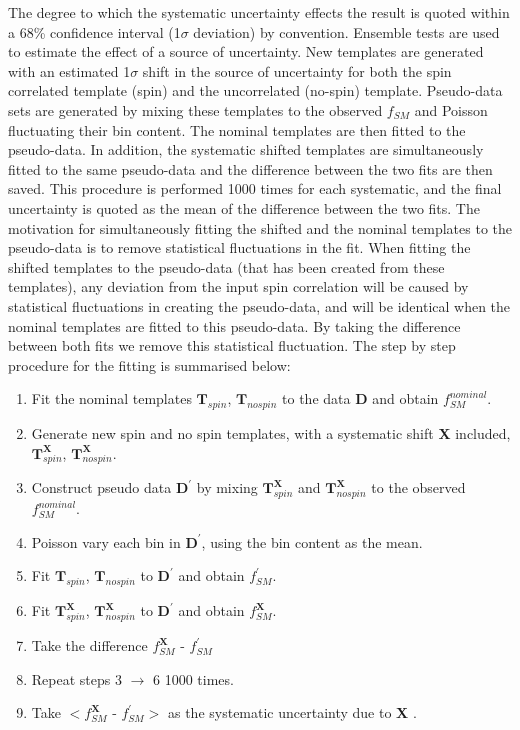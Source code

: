 The degree to which the systematic uncertainty effects the result is quoted within a 68\% confidence interval (1$\sigma$ deviation) by convention. Ensemble tests are used to estimate the effect of a source of uncertainty. New templates are generated with an estimated 1$\sigma$ shift in the source of uncertainty for both the spin correlated template (spin) and the uncorrelated (no-spin) template.  
Pseudo-data sets are generated by mixing these templates to the observed $f_{SM}$ and Poisson fluctuating their bin content.
The nominal templates are then fitted to the pseudo-data. In addition, the systematic shifted templates are simultaneously fitted to the same pseudo-data and the difference between the two fits are then saved. This procedure is performed 1000 times for each systematic, and the final uncertainty is quoted as the mean of the difference between the two fits.
	The motivation for simultaneously fitting the shifted and the nominal templates to the pseudo-data is to remove statistical fluctuations in the fit. When fitting the shifted templates to the pseudo-data (that has been created from these templates), any deviation from the input spin correlation will be caused by statistical fluctuations in creating the pseudo-data, and will be identical when the nominal templates are fitted to this pseudo-data. By taking the difference between both fits we remove this statistical fluctuation. The step by step procedure for the fitting is summarised below:
 
\begin{enumerate}
	\item Fit the nominal templates $\mathbf{T}_{spin}$, $\mathbf{T}_{nospin}$ to the data $\mathbf{D}$ and obtain $f_{SM}^{nominal}$.
	\item Generate new spin and no spin templates, with a systematic shift \textbf{X} included, $\mathbf{T}^{\mathbf{X}}_{spin}$, $\mathbf{T}^{\mathbf{X}}_{nospin}$.
	\item Construct pseudo data $\mathbf{D^\prime}$ by mixing $\mathbf{T}^{\mathbf{X}}_{spin}$ and $\mathbf{T}^{\mathbf{X}}_{nospin}$ to the observed $f_{SM}^{nominal}$. 
        \item Poisson vary each bin in $\mathbf{D^\prime}$, using the bin content as the mean.
	\item Fit $\mathbf{T}_{spin}$, $\mathbf{T}_{nospin}$ to $\mathbf{D^\prime}$ and obtain $f_{SM}^{\prime}$.
	\item Fit $\mathbf{T}^{\mathbf{X}}_{spin}$, $\mathbf{T}^{\mathbf{X}}_{nospin}$ to $\mathbf{D^\prime}$ and obtain $f_{SM}^{\mathbf{X}}$.
	\item Take the difference $f_{SM}^{\mathbf{X}}$ - $f_{SM}^{\prime}$
	\item Repeat steps 3 $\rightarrow$ 6 1000 times.
	\item Take $<f_{SM}^{\mathbf{X}}$ - $f_{SM}^{\prime}>$ as the systematic uncertainty due to \textbf{X} .
\end{enumerate}

